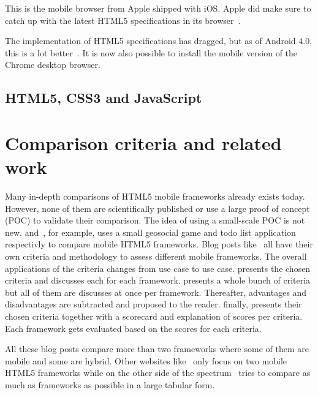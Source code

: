 \documentclass[a4paper]{artikel3}
\renewcommand{\paragraph}[1]{\vspace{2mm} \noindent {\bf #1}  }
\begin{document}
\paragraph{Mobile Safari}
This is the mobile browser from Apple shipped with iOS.
Apple did make sure to catch up with the latest HTML5 specifications in its browser~\cite{Hales2012}.

\paragraph{Android browser}
The implementation of HTML5 specifications has dragged, but as of Android 4.0, this is a lot better~\cite{Hales2012}.
It is now also possible to install the mobile version of the Chrome desktop browser.

\subsection{HTML5, CSS3 and JavaScript}

\section{Comparison criteria and related work}
\label{sec:comparisoncriteria}


Many in-depth comparisons of HTML5 mobile frameworks already exists today.  
However, none of them are scientifically published or use a large proof of concept (POC) to validate their comparison.  
The idea of using a small-scale POC is not new.  
\cite{Oeflman2011} and~\cite{Kosmaczewski2012},  for example,  uses a small geosocial game and todo list application respectivly to compare mobile HTML5 frameworks.
Blog posts like~\cite{Sarrafi2012a,Ayuso2012,Rozynski2011} all have their own criteria and methodology to assess different mobile frameworks.  
The overall applications of the criteria changes from use case to use case.  
\cite{Rozynski2011} presents the chosen criteria and discusses each for each framework.  
\cite{Ayuso2012} presents a whole bunch of criteria but all of them are discusses at once per framework.  
Thereafter,  advantages and disadvantages are subtracted and proposed to the reader.  
\cite{Sarrafi2012a} finally,  presents their chosen criteria together with a scorecard and explanation of scores per criteria.  
Each framework gets evaluated based on the scores for each criteria.

All these blog posts compare more than two frameworks where some of them are mobile and some are hybrid.  
Other websites like~\cite{Bristowe2012,Burris} only focus on two mobile HTML5 frameworks while on the other side of the spectrum~\cite{Falk2011} tries to compare as much as frameworks as possible in a large tabular form.
\end{document}
